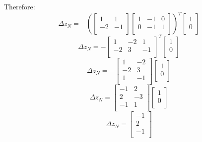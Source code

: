 \documentclass[14pt]{extarticle}
\begin{document}
\bigskip Therefore:
\[
    \Delta z_N = -\left(\begin{bmatrix}
        1 & 1 \\
        -2 & -1 \\
    \end{bmatrix}
    \begin{bmatrix}
        1 & -1 & 0 \\
        0 & -1 & 1 \\
    \end{bmatrix}\right)^T
    \begin{bmatrix}
        1 \\
        0 \\
    \end{bmatrix}
\]
\[
    \Delta z_N = -\begin{bmatrix}
        1 & -2 & 1 \\
        -2 & 3 & -1 \\
    \end{bmatrix}^T
    \begin{bmatrix}
        1 \\
        0 \\
    \end{bmatrix}
\]
\[
    \Delta z_N = -\begin{bmatrix}
        1 & -2 \\
        -2 & 3 \\
        1 & -1 \\
    \end{bmatrix}
    \begin{bmatrix}
        1 \\
        0 \\
    \end{bmatrix}
\]
\[
    \Delta z_N = \begin{bmatrix}
        -1 & 2 \\
        2 & -3 \\
        -1 & 1 \\
    \end{bmatrix}
    \begin{bmatrix}
        1 \\
        0 \\
    \end{bmatrix}
\]
\[
    \Delta z_N = \begin{bmatrix}
        -1 \\
        2 \\
        -1 \\
    \end{bmatrix}
\]
\end{document}
